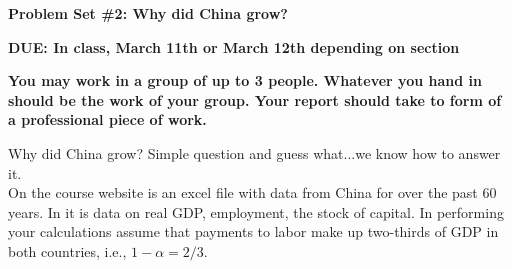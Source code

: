 \documentclass[11pt,pdftex,twoside,letterpaper]{exam}
\begin{document}
\centerline{}
\smallskip
\centerline{\Large \bf Problem Set \#2: Why did China grow?}
\vspace{3mm}
\centerline{\bf DUE: In class, March 11th or March 12th depending on section}
\medskip
{\bf You may work in a group of up to 3 people. Whatever you hand in should be the work of your
group. Your report should take to form of a professional piece of work.}


\begin{questions}

\question Why did China grow? Simple question and guess what...we know how to answer it.\\ 

On the course website is an excel file with data from China for over the past 60 years. In it is data on real GDP, employment, the stock of capital. In performing your calculations assume that payments to labor make up two-thirds of GDP in both countries, i.e., $1-\alpha=2/3$.

\medskip

\end{questions}
\end{document}
